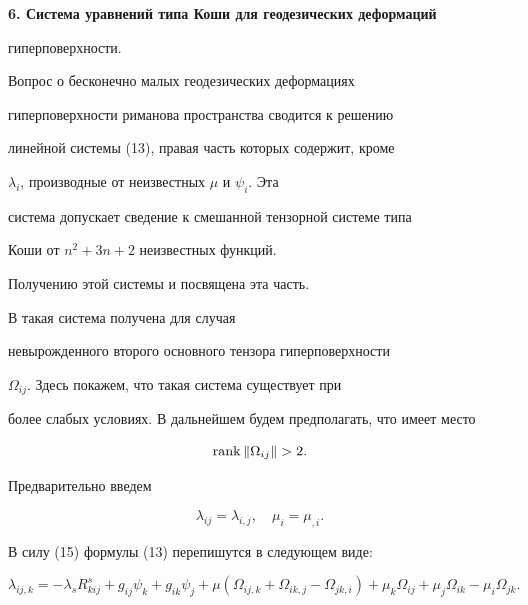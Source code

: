 \medskip





{\bf 6. Система уравнений типа Коши для геодезических деформаций


гиперповерхности.} 


Вопрос о бесконечно малых геодезических деформациях


гиперповерхности риманова пространства сводится к решению


линейной системы (13), правая часть которых содержит, кроме


$\lambda_i$, производные от неизвестных $\mu$ и $\psi_i$. Эта


система допускает сведение к смешанной тензорной системе типа


Коши от $n^2+3n+2$ неизвестных функций.





Получению этой системы и посвящена эта часть.


В \cite{ga89} такая система получена для случая


невырожденного второго основного тензора гиперповерхности


$\Omega_{ij}$. Здесь покажем, что такая система существует при


более слабых условиях. В дальнейшем будем предполагать, что имеет место


$$


\rank\|\Omega_{ij}\|>2.


$$





Предварительно введем 


\begin{equation}


\lambda_{ij}=\lambda_{i,j},\quad


\mu_i=\mu_{,i}.


\end{equation}





В силу (15) формулы (13) перепишутся в следующем виде:


\begin{equation}


\lambda_{ij,k}=-\lambda_sR_{kij}^s+g_{ij}\psi_k+g_{ik}\psi_j+


\mu (\Omega_{ij,k}+\Omega_{ik,j}-\Omega_{jk,i})+


\mu_k\Omega_{ij}+\mu_j\Omega_{ik}-\mu_i\Omega_{jk}.


\end{equation}


